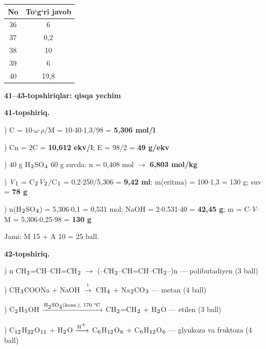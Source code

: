 \documentclass[11pt,a4paper]{article}
\renewcommand{\textsubscript}[1]{\ensuremath{_{\text{\fontsize{8}{8}\selectfont #1}}}}
\renewcommand{\textsuperscript}[1]{\ensuremath{^{\text{\fontsize{8}{8}\selectfont #1}}}}
\begin{document}
\noindent\begin{tabular}{|c|c|}\hline \textbf{No} & \textbf{To`g`ri javob}\\\hline
36 & 6\\\hline
37 & 0,2\\\hline
38 & 10\\\hline
39 & 6\\\hline
40 & 19,8\\\hline
\end{tabular}\par\medskip
\noindent\textbf{41--43-topshiriqlar: qisqa yechim}\par\smallskip
\noindent\textbf{41-topshiriq.}\par
{}) C = 10$\cdot$$\omega$$\cdot$$\rho$/M = 10$\cdot$40$\cdot$1,3/98 = \textbf{5,306 mol/l}\par
{}) Cn = 2C = \textbf{10,612 ekv/l}; E = 98/2 = \textbf{49 g/ekv}\par
{}) 40 g H\textsubscript{2}SO\textsubscript{4} 60 g suvda: n = 0,408 mol $\to$ \textbf{6,803 mol/kg}\par
{}) \textit{V}\textsubscript{1} = C\textsubscript{2}\textit{V}\textsubscript{2}/C\textsubscript{1} = 0,2$\cdot$250/5,306 = \textbf{9,42 ml}; m(eritma) = 100$\cdot$1,3 = 130 g; suv = \textbf{78 g}\par
{}) n(H\textsubscript{2}SO\textsubscript{4}) = 5,306$\cdot$0,1 = 0,531 mol; NaOH = 2$\cdot$0,531$\cdot$40 = \textbf{42,45 g}; m = C$\cdot$\textit{V}$\cdot$M = 5,306$\cdot$0,25$\cdot$98 = \textbf{130 g}\par
\noindent Jami: M 15 + A 10 = 25 ball.\par
\noindent\textbf{42-topshiriq.}\par
{}) n CH\textsubscript{2}=CH--CH=CH\textsubscript{2} $\to$ (--CH\textsubscript{2}--CH=CH--CH\textsubscript{2}--)n --- polibutadiyen (3 ball)\par
{}) CH\textsubscript{3}COONa + NaOH $\xrightarrow{\text{t}}$ CH\textsubscript{4} + Na\textsubscript{2}CO\textsubscript{3} --- metan (4 ball)\par
{}) C\textsubscript{2}H\textsubscript{5}OH $\xrightarrow{\text{H\textsubscript{2}SO\textsubscript{4}(kons.), 170 \textdegree{}C}}$ CH\textsubscript{2}=CH\textsubscript{2} + H\textsubscript{2}O --- etilen (3 ball)\par
{}) C\textsubscript{12}H\textsubscript{22}O\textsubscript{11} + H\textsubscript{2}O $\xrightarrow{\text{H\textsuperscript{+}}}$ C\textsubscript{6}H\textsubscript{12}O\textsubscript{6} + C\textsubscript{6}H\textsubscript{12}O\textsubscript{6} --- glyukoza va fruktoza (4 ball)\par
$$
\end{document}
